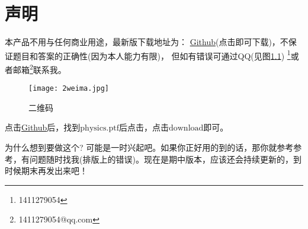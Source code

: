 \chapter{声明}
本产品不用与任何商业用途，最新版下载地址为：
\href{https://github.com/1411279054/Letax-learning-Note/tree/master/%E6%95%B0%E5%AD%A6%E5%88%86%E6%9E%90%E8%A7%A3%E9%A2%98%E6%8C%87%E5%8D%97%E8%AF%BE%E5%90%8E%E4%B9%A0%E9%A2%98%E9%87%8D%E6%8E%92}{Github}(点击即可下载)，不保证题目和答案的正确性(因为本人能力有限)，
但如有错误可通过QQ(见图\ref{fig:1}) \footnote{1411279054}或者邮箱\footnote{1411279054@qq.com}联系我。
\begin{figure}[htbp]
	\centering
	\texttt{[image: 2weima.jpg]}
	\caption{二维码}\label{fig:1}
\end{figure}

点击\href{https://github.com/1411279054/Letax-learning-Note/tree/master/%E6%95%B0%E5%AD%A6%E5%88%86%E6%9E%90%E8%A7%A3%E9%A2%98%E6%8C%87%E5%8D%97%E8%AF%BE%E5%90%8E%E4%B9%A0%E9%A2%98%E9%87%8D%E6%8E%92}{Github}后，找到$\mathrm{physics.ptf}$后点击，点击$\mathrm{download}$即可。
\\
\begin{remarkname}
	为什么想到要做这个? 可能是一时兴起吧。如果你正好用的到的话，那你就参考参考，有问题随时找我(排版上的错误)。现在是期中版本，应该还会持续更新的，到时候期末再发出来吧！
\end{remarkname}